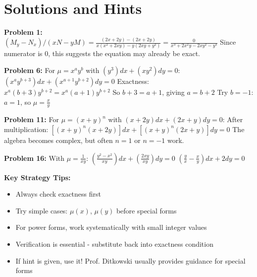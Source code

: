 \documentclass[12pt]{article}
\begin{document}
\section*{Solutions and Hints}

\textbf{Problem 1:} $(M_y - N_x)/(xN - yM) = \frac{(2x + 2y) - (2x + 2y)}{x(x^2 + 2xy) - y(2xy + y^2)} = \frac{0}{x^3 + 2x^2y - 2xy^2 - y^3}$
Since numerator is 0, this suggests the equation may already be exact.

\textbf{Problem 6:} For $\mu = x^a y^b$ with $(y^3)dx + (xy^2)dy = 0$:
$(x^a y^{b+3})dx + (x^{a+1} y^{b+2})dy = 0$
Exactness: $x^a(b+3)y^{b+2} = x^a(a+1)y^{b+2}$
So $b+3 = a+1$, giving $a = b+2$
Try $b = -1$: $a = 1$, so $\mu = \frac{x}{y}$

\textbf{Problem 11:} For $\mu = (x+y)^n$ with $(x + 2y)dx + (2x + y)dy = 0$:
After multiplication: $[(x+y)^n(x+2y)]dx + [(x+y)^n(2x+y)]dy = 0$
The algebra becomes complex, but often $n = 1$ or $n = -1$ work.

\textbf{Problem 16:} With $\mu = \frac{1}{xy}$:
$\left(\frac{y^2-x^2}{xy}\right)dx + \left(\frac{2xy}{xy}\right)dy = 0$
$\left(\frac{y}{x} - \frac{x}{y}\right)dx + 2dy = 0$

\textbf{Key Strategy Tips:}
\begin{itemize}
    \item Always check exactness first
    \item Try simple cases: $\mu(x)$, $\mu(y)$ before special forms
    \item For power forms, work systematically with small integer values
    \item Verification is essential - substitute back into exactness condition
    \item If hint is given, use it! Prof. Ditkowski usually provides guidance for special forms
\end{itemize}
\end{document}
